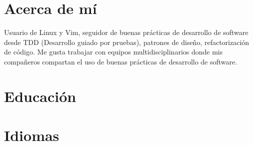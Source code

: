 \documentclass[10pt,a4paper,sans,colorlinks]{moderncv} %
\begin{document}

\makecvtitle %

\section{Acerca de mí}
  Usuario de Linux y Vim, seguidor de buenas prácticas de desarrollo de software desde TDD (Desarrollo guiado por pruebas), patrones de diseño, refactorización de código.
  Me gusta trabajar con equipos multidisciplinarios donde mis compañeros compartan el uso de buenas prácticas de desarrollo de software.

\section{Educación}





\section{Idiomas}
\end{document}
